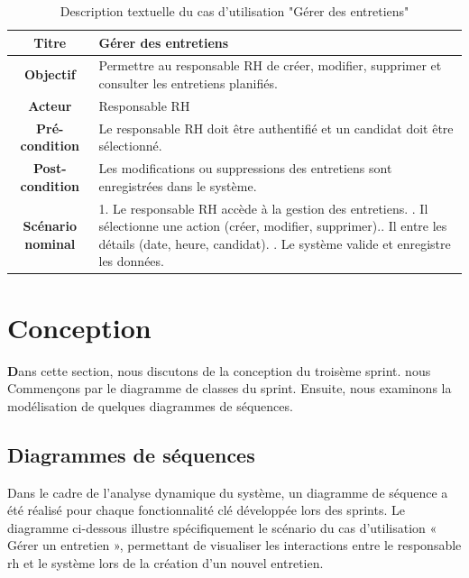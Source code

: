  \begin{table}[H]
 \caption{ Description textuelle du cas d’utilisation "Gérer des entretiens"}
    \centering
    \begin{tabular}{|c|p{12cm}|}
    \hline
    \textbf{Titre} & Gérer des entretiens \\
    \hline
    \textbf{Objectif} & Permettre au responsable RH de créer, modifier, supprimer et consulter les entretiens planifiés. \\
    \hline
    \textbf{Acteur}& Responsable RH\\
    \hline
    \textbf{Pré-condition} & Le responsable RH doit être authentifié et un candidat doit être sélectionné.
    \\
    \hline
    \textbf{Post-condition} & Les modifications ou suppressions des entretiens sont enregistrées dans le système.\\
    \hline
    \textbf{Scénario nominal} & 1. Le responsable RH accède à la gestion des entretiens. \newline
    2. Il sélectionne une action (créer, modifier, supprimer).\newline
    3. Il entre les détails (date, heure, candidat).
    \newline
    4. Le système valide et enregistre les données.\\
    \hline
    \end{tabular}
    \label{tab:user_stories}
\end{table}

\section{Conception}
\hspace{0.5cm}\textbf Dans cette section, nous discutons de la conception du troisème sprint. nous Commençons par le diagramme de classes du sprint. Ensuite, nous examinons la modélisation de quelques diagrammes de séquences. 





    \subsection{Diagrammes de séquences}
    Dans le cadre de l’analyse dynamique du système, un diagramme de séquence a été réalisé pour chaque fonctionnalité clé développée lors des sprints. Le diagramme ci-dessous illustre spécifiquement le scénario du cas d'utilisation « Gérer un entretien », permettant de visualiser les interactions entre le responsable rh et le système lors de la création d’un nouvel entretien.

